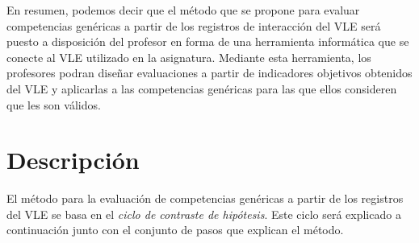 En resumen, podemos decir que el método que se propone para evaluar competencias genéricas a partir de los registros de interacción del VLE será puesto a disposición del profesor en forma de una herramienta informática que se conecte al VLE utilizado en la asignatura. Mediante esta herramienta, los profesores podran diseñar evaluaciones a partir de indicadores objetivos obtenidos del VLE y aplicarlas a las competencias genéricas para las que ellos consideren que les son válidos.




\section{Descripción}

El método para la evaluación de competencias genéricas a partir de los registros del VLE se basa en el \emph{ciclo de contraste de hipótesis}. Este ciclo será explicado a continuación junto con el conjunto de pasos que explican el método.


